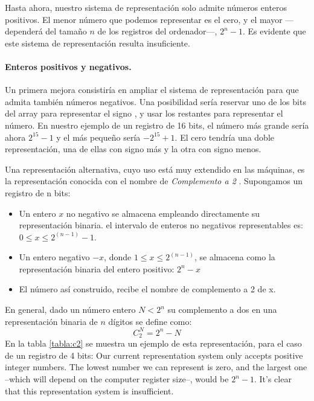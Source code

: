 \begin{paracol}{2}
 Hasta ahora, nuestro sistema de representación solo admite números enteros positivos. El menor número que podemos representar es el cero, y el mayor ---dependerá del tamaño $n$ de los registros del ordenador---, $2^n-1$.  Es evidente que este sistema de representación resulta insuficiente.
 
 \paragraph{Enteros positivos y negativos.}
 Un primera mejora consistiría en ampliar el sistema de representación para que admita también números negativos. Una posibilidad sería reservar uno de los bits del array para representar el signo , y usar los restantes para representar el número. En nuestro ejemplo de un registro de 16 bits, el número más grande sería ahora $2^{15}-1$ y el más pequeño sería $-2^{15}+1$. El cero tendría una doble representación, una de ellas con signo más y la otra con signo menos.
 
 Una representación alternativa, cuyo uso está muy extendido en las máquinas, es la representación conocida con el nombre de \emph{Complemento a 2}  . Supongamos un registro de n bits:
 \begin{itemize}
 \item Un entero $x$ no negativo se almacena empleando directamente su representación binaria. el intervalo de enteros no negativos representables es: $0 \le x \le 2^{(n-1)}-1$.
 \item Un entero negativo $-x$, donde $1 \le x \le 2^{(n-1)}$, se almacena como la representación binaria del entero positivo: $2^{n}-x$
 \item El número así construido,  recibe el nombre de complemento a 2 de x.
 \end{itemize}
 En general, dado un número entero $N<2^n$ su complemento a dos en una representación binaria de $n$ dígitos se define como:
 \begin{equation*}
 C_2^N=2^n-N
 \end{equation*} 
 En la tabla \ref{tabla:c2} se muestra un ejemplo de esta representación, para el caso de un registro de 4 bits:
 \switchcolumn
Our current representation system only accepts positive integer numbers. The lowest number we can represent is zero, and the largest one --which will depend on the computer register size--, would be $2^n-1$. It's clear that this representation system is insufficient.

\end{paracol}
